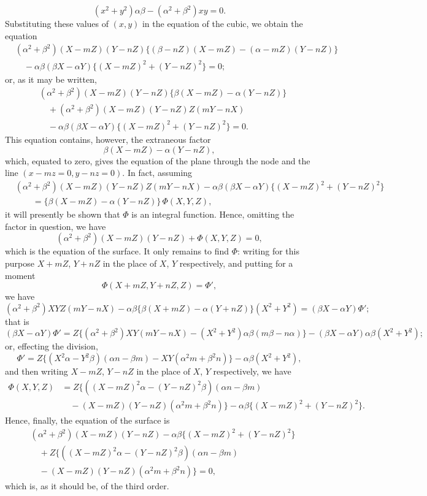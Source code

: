 \documentclass[11pt,a4paper]{article}
\theoremstyle{plain}
\begin{document}
\[
(x^2 + y^2)\alpha\beta - (\alpha^2 + \beta^2)xy = 0.
\]
Substituting these values of $(x, y)$ in the equation of the cubic, we obtain the equation
\begin{align*}
&(\alpha^2 + \beta^2)(X - mZ)(Y - nZ)\{(\beta - nZ)(X - mZ) - (\alpha - mZ)(Y - nZ)\} \\
&\quad - \alpha\beta(\beta X - \alpha Y)\{(X - mZ)^2 + (Y - nZ)^2\} = 0;
\end{align*}
or, as it may be written,
\begin{align*}
&(\alpha^2 + \beta^2)(X - mZ)(Y - nZ)\{\beta(X - mZ) - \alpha(Y - nZ)\} \\
&\quad + (\alpha^2 + \beta^2)(X - mZ)(Y - nZ)Z(mY - nX) \\
&\quad - \alpha\beta(\beta X - \alpha Y)\{(X - mZ)^2 + (Y - nZ)^2\} = 0.
\end{align*}
This equation contains, however, the extraneous factor
\[
\beta(X - mZ) - \alpha(Y - nZ),
\]
which, equated to zero, gives the equation of the plane through the node and the line $(x - mz = 0, y - nz = 0)$. In fact, assuming
\begin{align*}
&(\alpha^2 + \beta^2)(X - mZ)(Y - nZ)Z(mY - nX) - \alpha\beta(\beta X - \alpha Y)\{(X - mZ)^2 + (Y - nZ)^2\} \\
&\qquad = \{\beta(X - mZ) - \alpha(Y - nZ)\}\,\Phi(X, Y, Z),
\end{align*}
it will presently be shown that $\Phi$ is an integral function. Hence, omitting the factor in question, we have
\[
(\alpha^2 + \beta^2)(X - mZ)(Y - nZ) + \Phi(X, Y, Z) = 0,
\]
which is the equation of the surface. It only remains to find $\Phi$: writing for this purpose $X + mZ$, $Y + nZ$ in the place of $X$, $Y$ respectively, and putting for a moment
\[
\Phi(X + mZ, Y + nZ, Z) = \Phi',
\]
we have
\[
(\alpha^2 + \beta^2)XYZ(mY - nX) - \alpha\beta\{\beta(X + mZ) - \alpha(Y + nZ)\}(X^2 + Y^2) = (\beta X - \alpha Y)\Phi';
\]
that is
\[
(\beta X - \alpha Y)\Phi' = Z\{(\alpha^2 + \beta^2)XY(mY - nX) - (X^2 + Y^2)\alpha\beta(m\beta - n\alpha)\} - (\beta X - \alpha Y)\alpha\beta(X^2 + Y^2);
\]
or, effecting the division,
\[
\Phi' = Z\{(X^2\alpha - Y^2\beta)(\alpha n - \beta m) - XY(\alpha^2 m + \beta^2 n)\} - \alpha\beta(X^2 + Y^2),
\]
and then writing $X - mZ$, $Y - nZ$ in the place of $X$, $Y$ respectively, we have
\begin{align*}
\Phi(X, Y, Z) &= Z\{((X - mZ)^2\alpha - (Y - nZ)^2\beta)(\alpha n - \beta m) \\
&\quad - (X - mZ)(Y - nZ)(\alpha^2 m + \beta^2 n)\} - \alpha\beta\{(X - mZ)^2 + (Y - nZ)^2\}.
\end{align*}
Hence, finally, the equation of the surface is
\begin{align*}
&(\alpha^2 + \beta^2)(X - mZ)(Y - nZ) - \alpha\beta\{(X - mZ)^2 + (Y - nZ)^2\} \\
&\quad + Z\{((X - mZ)^2\alpha - (Y - nZ)^2\beta)(\alpha n - \beta m) \\
&\quad - (X - mZ)(Y - nZ)(\alpha^2 m + \beta^2 n)\} = 0,
\end{align*}
which is, as it should be, of the third order.
\end{document}
